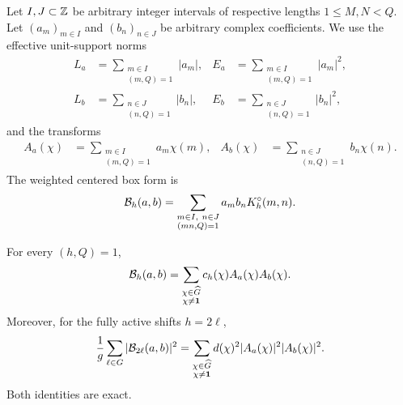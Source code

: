 Let $I,J\subset\mathbb Z$ be arbitrary integer intervals of respective lengths
$1\leq M,N<Q$.  Let $(a_m)_{m\in I}$ and $(b_n)_{n\in J}$ be arbitrary
complex coefficients.  We use the effective unit-support norms
\begin{align}
 L_a&=\sum_{\substack{m\in I\\(m,Q)=1}}|a_m|,
 &E_a&=\sum_{\substack{m\in I\\(m,Q)=1}}|a_m|^2,
 \label{eq:weighted-a-norms}\\
 L_b&=\sum_{\substack{n\in J\\(n,Q)=1}}|b_n|,
 &E_b&=\sum_{\substack{n\in J\\(n,Q)=1}}|b_n|^2,
 \label{eq:weighted-b-norms}
\end{align}
and the transforms
\begin{align}
 A_a(\chi)&=\sum_{\substack{m\in I\\(m,Q)=1}}a_m\chi(m),
 &A_b(\chi)&=\sum_{\substack{n\in J\\(n,Q)=1}}b_n\chi(n).
 \label{eq:weighted-character-transforms}
\end{align}
The weighted centered box form is
\begin{equation}\label{eq:weighted-box-form}
 \mathcal B_h(a,b)
 =\sum_{\substack{m\in I,\ n\in J\\(mn,Q)=1}}
 a_mb_nK_h^\circ(m,n).
\end{equation}

\begin{proposition}
\label{prop:weighted-shift-parseval}
For every $(h,Q)=1$,
\begin{equation}\label{eq:weighted-box-character-expansion}
 \mathcal B_h(a,b)
 =\sum_{\substack{\chi\in\widehat G\\\chi\ne\mathbf 1}}
 c_h(\chi)A_a(\chi)A_b(\chi).
\end{equation}
Moreover, for the fully active shifts $h=2\ell$,
\begin{equation}\label{eq:weighted-complete-shift-parseval}
 \frac1g\sum_{\ell\in G}|\mathcal B_{2\ell}(a,b)|^2
 =\sum_{\substack{\chi\in\widehat G\\\chi\ne\mathbf 1}}
 d(\chi)^2|A_a(\chi)|^2|A_b(\chi)|^2.
\end{equation}
Both identities are exact.
\end{proposition}

